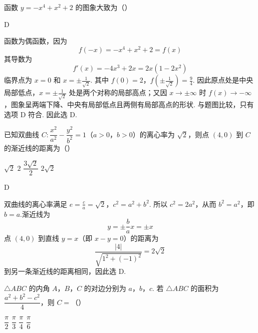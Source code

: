\begin{problem}
函数 \(y=-x^4+x^2+2\) 的图象大致为（\quad）

    {}
    {}
    {}
\end{problem}

\begin{answer}
D
\end{answer}

\begin{solution}
函数为偶函数，因为
\[
f(-x)=-x^4+x^2+2=f(x)
\]
其导数为
\[
f'(x)=-4x^3+2x=2x(1-2x^2)
\]
临界点为 \(x=0\) 和 \(x=\pm\frac1{\sqrt2}\). 其中
\(f(0)=2\)，\(f\left(\pm\frac1{\sqrt2}\right)=\frac94\).
因此原点处是中央局部低点，\(x=\pm\frac1{\sqrt2}\) 处是两个对称的局部高点；又因 \(x\to\pm\infty\) 时 \(f(x)\to-\infty\)，图象呈两端下降、中央有局部低点且两侧有局部高点的形状. 与题图比较，只有选项 D 符合. 因此选 D.
\end{solution}

\begin{problem}
已知双曲线 \(C:\dfrac{x^2}{a^2}-\dfrac{y^2}{b^2}=1\)（\(a>0\)，\(b>0\)）的离心率为 \(\sqrt2\)，则点 \((4,0)\) 到 \(C\) 的渐近线的距离为（\quad）

\choices
    {\(\sqrt2\)}
    {\(2\)}
    {\(\dfrac{3\sqrt2}{2}\)}
    {\(2\sqrt2\)}
\end{problem}

\begin{answer}
D
\end{answer}

\begin{solution}
双曲线的离心率满足
\(e=\frac ca=\sqrt2\)，\(c^2=a^2+b^2\).
所以 \(c^2=2a^2\)，从而 \(b^2=a^2\)，即 \(b=a\).渐近线为
\[
y=\pm\frac ba x=\pm x
\]
点 \((4,0)\) 到直线 \(y=x\)（即 \(x-y=0\)）的距离为
\[
\frac{|4|}{\sqrt{1^2+(-1)^2}}=2\sqrt2
\]
到另一条渐近线的距离相同，因此选 D.
\end{solution}

\begin{problem}
\(\triangle ABC\) 的内角 \(A\)，\(B\)，\(C\) 的对边分别为 \(a\)，\(b\)，\(c\). 若 \(\triangle ABC\) 的面积为 \(\dfrac{a^2+b^2-c^2}{4}\)，则 \(C=\)（\quad）

\choices
    {\(\dfrac\pi2\)}
    {\(\dfrac\pi3\)}
    {\(\dfrac\pi4\)}
    {\(\dfrac\pi6\)}
\end{problem}

